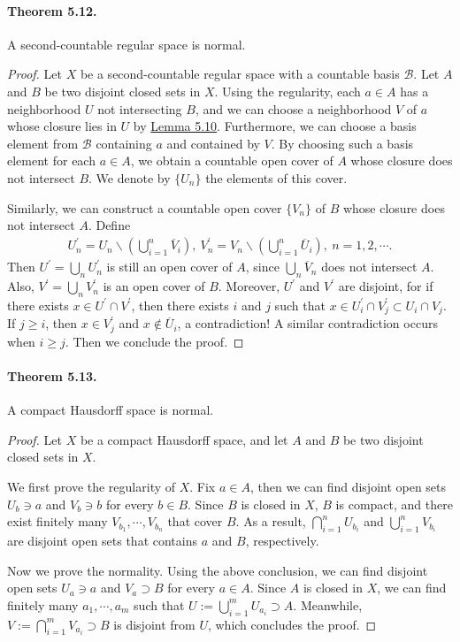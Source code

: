 \documentclass{article}
\numberwithin{equation}{section}
\theoremstyle{plain}
\theoremstyle{definition}
\begin{document}
\paragraph{Theorem 5.12.\label{thm:5.12}} A second-countable regular space is normal.
\begin{proof}
Let $X$ be a second-countable regular space with a countable basis $\mathscr{B}$. Let $A$ and $B$ be two disjoint closed sets in $X$. Using the regularity, each $a\in A$ has a neighborhood $U$ not intersecting $B$, and we can choose a neighborhood $V$ of $a$ whose closure lies in $U$ by \hyperref[lemma:5.10]{Lemma 5.10}. Furthermore, we can choose a basis element from $\mathscr{B}$ containing $a$ and contained by $V$. By choosing such a basis element for each $a\in A$, we obtain a countable open cover of $A$ whose closure does not intersect $B$. We denote  by $\{U_n\}$ the elements of this cover.

Similarly, we can construct a countable open cover $\{V_n\}$ of $B$ whose closure does not intersect $A$. Define
\begin{align*}
	U_n^\prime = U_n\backslash\left(\bigcup_{i=1}^n\overline{V}_i\right),\ V_n^\prime = V_n\backslash\left(\bigcup_{i=1}^n\overline{U}_i\right),\ n=1,2,\cdots.
\end{align*}
Then $U^\prime=\bigcup_n U_n^\prime$ is still an open cover of $A$, since $\bigcup_n\overline{V}_n$ does not intersect $A$. Also, $V^\prime=\bigcup_n V_n^\prime$ is an open cover of $B$. Moreover, $U^\prime$ and $V^\prime$ are disjoint, for if there exists $x\in U^\prime\cap V^\prime$, then there exists $i$ and $j$ such that $x\in U_i^\prime\cap V_j^\prime\subset U_i\cap V_j$. If $j\geq i$, then $x\in V_j^\prime$ and $x\notin \overline{U}_i$, a contradiction! A similar contradiction occurs when $i\geq j$. Then we conclude the proof.
\end{proof}

\paragraph{Theorem 5.13.\label{thm:5.13}} A compact Hausdorff space is normal.
\begin{proof}
Let $X$ be a compact Hausdorff space, and let $A$ and $B$ be two disjoint closed sets in $X$. 

We first prove the regularity of $X$. Fix $a\in A$, then we can find disjoint open sets $U_b\ni a$ and $V_b\ni b$ for every $b\in B$. Since $B$ is closed in $X$, $B$ is compact, and there exist finitely many $V_{b_1},\cdots,V_{b_n}$ that cover $B$. As a result, $\bigcap_{i=1}^n U_{b_i}$ and $\bigcup_{i=1}^n V_{b_i}$ are disjoint open sets that contains $a$ and $B$, respectively.

Now we prove the normality. Using the above conclusion, we can find disjoint open sets $U_a\ni a$ and $V_a\supset B$ for every $a\in A$. Since $A$ is closed in $X$, we can find finitely many $a_1,\cdots,a_m$ such that $U:=\bigcup_{i=1}^m U_{a_i}\supset A$. Meanwhile, $V:=\bigcap_{i=1}^m V_{a_i}\supset B$ is disjoint from $U$, which concludes the proof.
\end{proof}
\end{document}
